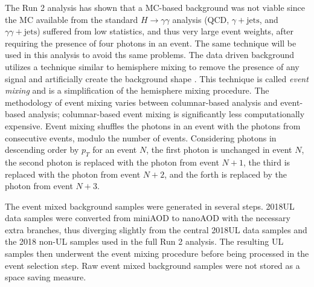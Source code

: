 \documentclass[12pt]{article}
\begin{document}
The Run 2 analysis has shown that a MC-based background was not viable since the MC available from the standard $H \rightarrow \gamma\gamma$ analysis (QCD, $\gamma + \mathrm{jets}$, and $\gamma\gamma + \mathrm{jets}$) suffered from low statistics, and thus very large event weights, after requiring the presence of four photons in an event. The same technique will be used in this analysis to avoid ths same problems. The data driven background utilizes a technique similar to hemisphere mixing to remove the presence of any signal and artificially create the background shape \cite{hemisphere_mixing}. This technique is called \textit{event mixing} and is a simplification of the hemisphere mixing procedure. The methodology of event mixing varies between columnar-based analysis and event-based analysis; columnar-based event mixing is significantly less computationally expensive. Event mixing shuffles the photons in an event with the photons from consecutive events, modulo the number of events. Considering photons in descending order by $p_T$ for an event $N$, the first photon is unchanged in event $N$, the second photon is replaced with the photon from event $N+1$, the third is replaced with the photon from event $N+2$, and the forth is replaced by the photon from event $N+3$.\par

The event mixed background samples were generated in several steps. 2018UL data samples were converted from miniAOD to nanoAOD with the necessary extra branches, thus diverging slightly from the central 2018UL data samples and the 2018 non-UL samples used in the full Run 2 analysis. The resulting UL samples then underwent the event mixing procedure before being processed in the event selection step. Raw event mixed background samples were not stored as a space saving measure.
\par
\end{document}
